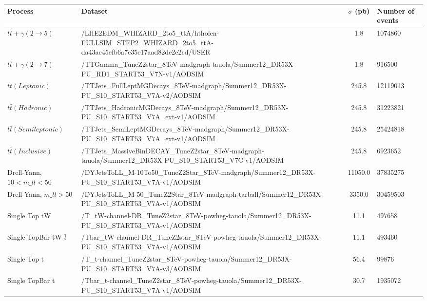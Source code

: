 \begin{table} \label{tab-MCSamples}
\begin{center}

\begin{tabular}{|l| p{12.5cm} |c|p{2cm}|}
\hline
	\textbf{Process} & \textbf{Dataset} & \textbf{$\sigma$ (pb)} & \textbf{Number of events} \\
\hline
	$t\bar{t}+\gamma (2\to5)$ & /LHE2EDM\_WHIZARD\_2to5\_ttA/htholen-FULLSIM\_STEP2\_WHIZARD\_2to5\_ttA-da43ae45efb6a7c35e17aad82de2e2cd/USER & 1.8 & 1074860 \\
	$t\bar{t}+\gamma (2\to7)$ & /TTGamma\_TuneZ2star\_8TeV-madgraph-tauola/Summer12\_DR53X-PU\_RD1\_START53\_V7N-v1/AODSIM & 1.8 & 916500\\ 
\hline	
	$t\bar{t}(Leptonic)$ & /TTJets\_FullLeptMGDecays\_8TeV-madgraph/Summer12\_DR53X-PU\_S10\_START53\_V7A-v2/AODSIM & 245.8 & 12119013\\
	$t\bar{t}(Hadronic)$ & /TTJets\_HadronicMGDecays\_8TeV-madgraph/Summer12\_DR53X-PU\_S10\_START53\_V7A\_ext-v1/AODSIM & 245.8 & 31223821\\
	$t\bar{t}(Semileptonic)$ & /TTJets\_SemiLeptMGDecays\_8TeV-madgraph/Summer12\_DR53X-PU\_S10\_START53\_V7A\_ext-v1/AODSIM & 245.8 & 25424818\\
	$t\bar{t}(Inclusive)$ & /TTJets\_MassiveBinDECAY\_TuneZ2star\_8TeV-madgraph-tauola/Summer12\_DR53X-PU\_S10\_START53\_V7C-v1/AODSIM & 245.8 & 6923652\\
\hline	
	Drell-Yann, $10 < m\_{ll} < 50$ & /DYJetsToLL\_M-10To50\_TuneZ2Star\_8TeV-madgraph/Summer12\_DR53X-PU\_S10\_START53\_V7A-v1/AODSIM & 11050.0 & 37835275\\
	Drell-Yann, $m\_{ll} > 50$ & /DYJetsToLL\_M-50\_TuneZ2Star\_8TeV-madgraph-tarball/Summer12\_DR53X-PU\_S10\_START53\_V7A-v1/AODSIM & 3350.0 & 30459503\\
\hline	
	Single Top tW & /T\_tW-channel-DR\_TuneZ2star\_8TeV-powheg-tauola/Summer12\_DR53X-PU\_S10\_START53\_V7A-v1/AODSIM & 11.1 & 497658 \\
	Single TopBar tW $\bar{t}$ & /Tbar\_tW-channel-DR\_TuneZ2star\_8TeV-powheg-tauola/Summer12\_DR53X-PU\_S10\_START53\_V7A-v1/AODSIM & 11.1 & 493460 \\
	Single Top t & /T\_t-channel\_TuneZ2star\_8TeV-powheg-tauola/Summer12\_DR53X-PU\_S10\_START53\_V7A-v3/AODSIM & 56.4 & 99876 \\
	Single TopBar t & /Tbar\_t-channel\_TuneZ2star\_8TeV-powheg-tauola/Summer12\_DR53X-PU\_S10\_START53\_V7A-v1/AODSIM & 30.7 & 1935072 \\

\end{tabular}
\end{center}
\end{table}

